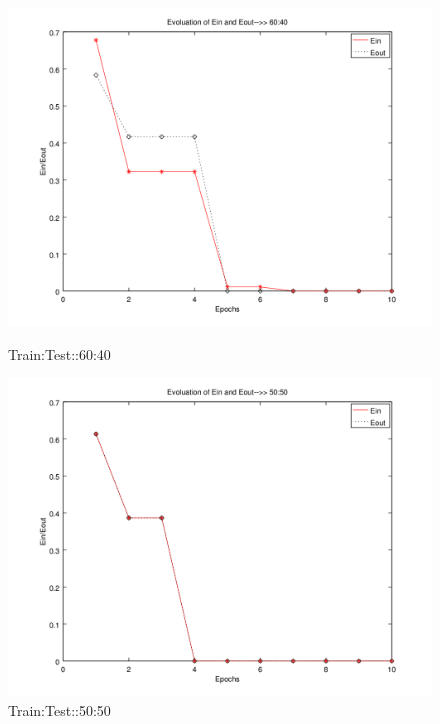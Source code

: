 \documentclass{sem6}
\begin{document}
\begin{figure}[!tbp]
\centering
\begin{minipage}[b]{0.45\textwidth}
\includegraphics[width=\textwidth]{../perceptron/perceptron2.png}
\caption{Train:Test::60:40}
\end{minipage}
\hfill
\begin{minipage}[b]{0.45\textwidth}
\includegraphics[width=\textwidth]{../perceptron/perceptron3.png}
\caption{Train:Test::50:50}
\end{minipage}
\end{figure}
\end{document}
